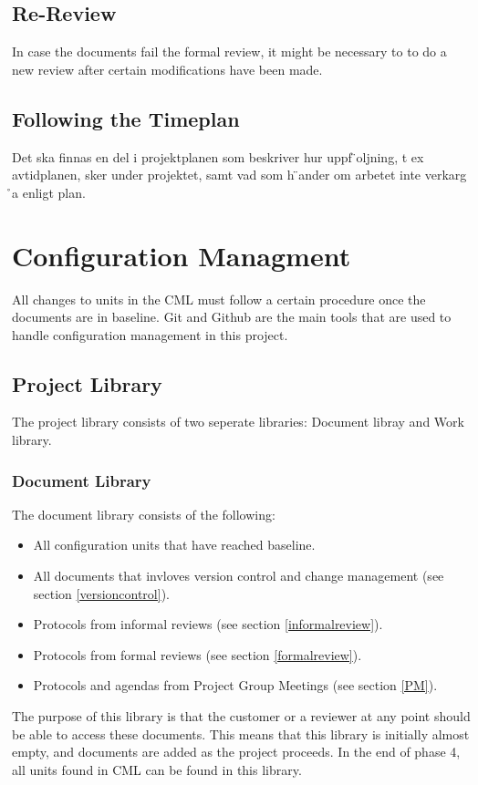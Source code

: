 \documentclass{article}
\begin{document}
    \subsection{Re-Review}
        In case the documents fail the formal review, it might be necessary to
        to do a new review after certain modifications have been made.
            
    \subsection{Following the Timeplan}
        
            Det  ska  finnas  en  del  i  projektplanen  som  beskriver  hur  uppf ̈oljning,  t  ex  avtidplanen,  sker under projektet,  samt vad som h ̈ander om arbetet inte verkarg ̊a enligt plan.  

\section{Configuration Managment}   %
    All changes to units in the CML must follow a certain procedure once the documents
    are in baseline. Git and Github are the main tools that are used to handle configuration management in this project.

    \subsection{Project Library \label{project_library}}
        The project library consists of two seperate libraries: Document libray and Work library.
    
        \subsubsection{Document Library \label{doclibrary}}
            The document library consists of the following:
            
            \begin{itemize}
                \item All configuration units that have reached baseline.
                \item All documents that invloves version control and change management (see                       section \ref{versioncontrol}).
                \item Protocols from informal reviews (see section \ref{informalreview}).
                \item Protocols from formal reviews (see section \ref{formalreview}).
                \item Protocols and agendas from Project Group Meetings (see section \ref{PM}).
            \end{itemize}
            \noindent
            The purpose of this library is that the customer or a reviewer at any point should be able to access these documents. 
            This means that this library is initially almost empty, and documents are added as the project proceeds. In the end of phase 4, all units found in CML can be found in this library.
\end{document}
